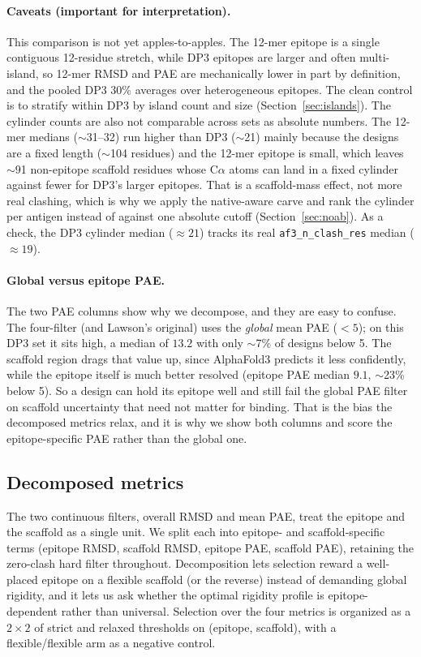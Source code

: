 \paragraph{Caveats (important for interpretation).}
This comparison is not yet apples-to-apples. The 12-mer epitope is a single contiguous
12-residue stretch, while DP3 epitopes are larger and often multi-island, so 12-mer RMSD and
PAE are mechanically lower in part by definition, and the pooled DP3 30\% averages over
heterogeneous epitopes. The clean control is to stratify within DP3 by island count and size
(Section~\ref{sec:islands}). The cylinder counts are also not comparable across sets as absolute
numbers. The 12-mer medians ($\sim$31--32) run higher than DP3 ($\sim$21) mainly because the
designs are a fixed length ($\sim$104 residues) and the 12-mer epitope is small, which leaves
$\sim$91 non-epitope scaffold residues whose C$\alpha$ atoms can land in a fixed cylinder
against fewer for DP3's larger epitopes. That is a scaffold-mass effect, not more real
clashing, which is why we apply the native-aware carve and rank the cylinder per antigen
instead of against one absolute cutoff (Section~\ref{sec:noab}). As a check, the DP3 cylinder
median ($\approx 21$) tracks its real \texttt{af3\_n\_clash\_res} median ($\approx 19$).

\paragraph{Global versus epitope PAE.}
The two PAE columns show why we decompose, and they are easy to confuse. The four-filter (and
Lawson's original) uses the \emph{global} mean PAE ($<5$); on this DP3 set it sits high, a
median of $13.2$ with only $\sim$7\% of designs below 5. The scaffold region drags that value
up, since AlphaFold3 predicts it less confidently, while the epitope itself is much better
resolved (epitope PAE median $9.1$, $\sim$23\% below 5). So a design can hold its epitope well
and still fail the global PAE filter on scaffold uncertainty that need not matter for binding.
That is the bias the decomposed metrics relax, and it is why we show both columns and score
the epitope-specific PAE rather than the global one.

\subsection{Decomposed metrics}\label{sec:decomp}
The two continuous filters, overall RMSD and mean PAE, treat the epitope and the scaffold
as a single unit. We split each into epitope- and scaffold-specific terms (epitope RMSD,
scaffold RMSD, epitope PAE, scaffold PAE), retaining the zero-clash hard filter throughout.
Decomposition lets selection reward a well-placed epitope on a flexible scaffold (or the
reverse) instead of demanding global rigidity, and it lets us ask whether the optimal
rigidity profile is epitope-dependent rather than universal. Selection over the four metrics
is organized as a $2\times2$ of strict and relaxed thresholds on (epitope, scaffold), with a
flexible/flexible arm as a negative control.

